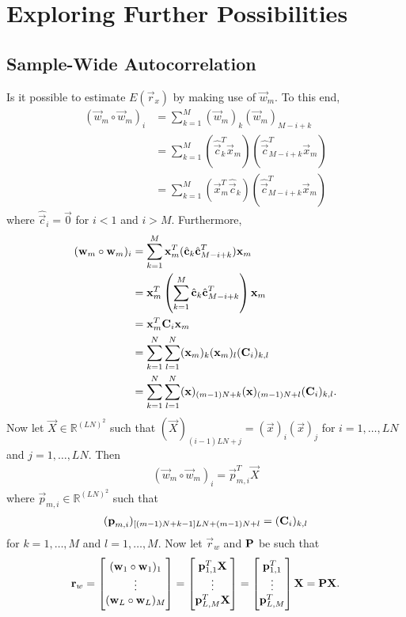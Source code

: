 \documentclass[a4paper, openany, oneside]{memoir}
\begin{document}
\section{Exploring Further Possibilities}
\subsection{Sample-Wide Autocorrelation}
Is it possible to estimate $E(\vec{r}_x)$ by making use of $\vec{w}_m$. To this end,
\begin{align*}
    (\vec{w}_m \circ \vec{w}_m)_i &= \sum_{k=1}^M (\vec{w}_m)_k (\vec{w}_m)_{M-i+k} \\
    &= \sum_{k=1}^M (\hat{\vec{c}}_k^T \vec{x}_m)(\hat{\vec{c}}_{M-i+k}^T \vec{x}_m) \\
    &= \sum_{k=1}^M (\vec{x}_m^T \hat{\vec{c}}_k)(\hat{\vec{c}}_{M-i+k}^T \vec{x}_m)
\end{align*}
where $\hat{\vec{c}}_i = \vec{0}$ for $i < 1$ and $i > M$. Furthermore,
\begin{align*}
    (\boldsymbol{\mathbf{w}}_m \circ \boldsymbol{\mathbf{w}}_m)_i &= \sum_{k=1}^M \boldsymbol{\mathbf{x}}_m^T (\hat{\boldsymbol{\mathbf{c}}}_k \hat{\boldsymbol{\mathbf{c}}}_{M-i+k}^T) \boldsymbol{\mathbf{x}}_m \\
    &= \boldsymbol{\mathbf{x}}_m^T\left(\sum_{k=1}^M  \hat{\boldsymbol{\mathbf{c}}}_k \hat{\boldsymbol{\mathbf{c}}}_{M-i+k}^T\right) \boldsymbol{\mathbf{x}}_m \\
    &= \boldsymbol{\mathbf{x}}_m^T \boldsymbol{\mathbf{C}}_i \boldsymbol{\mathbf{x}}_m \\
    &= \sum_{k = 1}^N \sum_{l=1}^N (\boldsymbol{\mathbf{x}}_m)_k (\boldsymbol{\mathbf{x}}_m)_l (\boldsymbol{\mathbf{C}}_i)_{k,l} \\
    &= \sum_{k = 1}^N \sum_{l=1}^N (\boldsymbol{\mathbf{x}})_{(m-1)N+k} (\boldsymbol{\mathbf{x}})_{(m-1)N+l} (\boldsymbol{\mathbf{C}}_i)_{k,l}.
\end{align*}
Now let $\vec{X} \in \mathbb{R}^{(LN)^2}$ such that $(\vec{X})_{(i-1)LN+j} = (\vec{x})_i (\vec{x})_j$ for $i = 1,\ldots,LN$ and $j = 1,\ldots,LN$. Then
\begin{align*}
    (\vec{w}_m \circ \vec{w}_m)_i = \vec{p}_{m,i}^T \vec{X}
\end{align*}
where $\vec{p}_{m,i} \in \mathbb{R}^{(LN)^2}$ such that
\begin{align*}
    (\boldsymbol{\mathbf{p}}_{m,i})_{[(m-1)N+k-1]LN+(m-1)N+l} = (\boldsymbol{\mathbf{C}}_i)_{k,l}
\end{align*}
for $k = 1,\ldots,M$ and $l = 1,\ldots,M$. Now let $\vec{r}_w$ and $\boldsymbol{\mathbf{P}}$ be such that
\begin{align*}
    \boldsymbol{\mathbf{r}}_w = \begin{bmatrix}
        (\boldsymbol{\mathbf{w}}_1 \circ \boldsymbol{\mathbf{w}}_1)_1 \\
        \vdots \\
        (\boldsymbol{\mathbf{w}}_L \circ \boldsymbol{\mathbf{w}}_L)_M
    \end{bmatrix} = \begin{bmatrix}
        \boldsymbol{\mathbf{p}}_{1,1}^T \boldsymbol{\mathbf{X}} \\
        \vdots \\
        \boldsymbol{\mathbf{p}}_{L,M}^T \boldsymbol{\mathbf{X}}
    \end{bmatrix} = \begin{bmatrix}
        \boldsymbol{\mathbf{p}}_{1,1}^T \\
        \vdots \\
        \boldsymbol{\mathbf{p}}_{L,M}^T
    \end{bmatrix} \boldsymbol{\mathbf{X}} = \boldsymbol{\mathbf{P}} \boldsymbol{\mathbf{X}}.
\end{align*}
\end{document}
